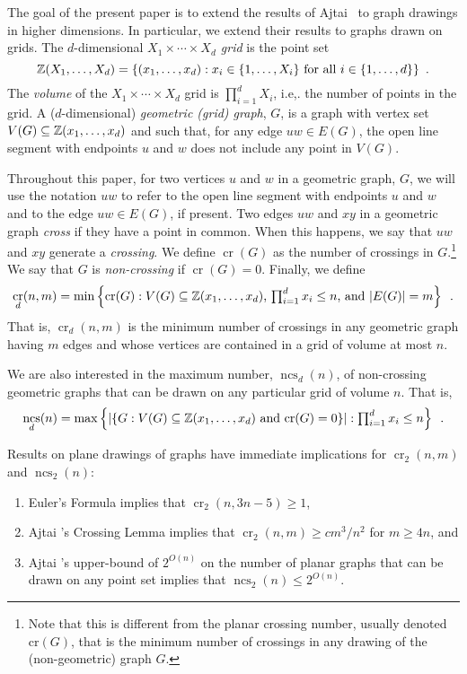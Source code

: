\documentclass{patmorin}
\DeclareMathOperator{\crs}{cr}
\DeclareMathOperator{\ncs}{ncs}
\begin{document}
The goal of the present paper is to extend the results of Ajtai
\etal\ to graph drawings in higher dimensions.  In particular, we
extend their results to graphs drawn on grids.  The $d$-dimensional
\emph{$X_1\times\cdots\times X_d$ grid} is the point set
\[  \mathbb{Z}(X_1,\ldots,X_d) = \{(x_1,\ldots,x_d): 
      \mbox{$x_i\in\{1,\ldots,X_i\}$ for all $i\in\{1,\ldots,d\}$}\}
	\enspace .\]
The \emph{volume} of the $X_1\times\cdots\times X_d$ grid is
$\prod_{i=1}^d X_i$, i.e,. the number of points in the grid.
A ($d$-dimensional) \emph{geometric (grid) graph}, $G$, is a graph with
vertex set $V(G)\subseteq \mathbb{Z}(x_1,\ldots,x_d)$ and such that, for any
edge $uw\in E(G)$, the open line segment with endpoints $u$ and $w$
does not include any point in $V(G)$.

Throughout this paper, for two vertices $u$ and $w$ in a geometric graph,
$G$, we will use the notation $uw$ to refer to the open line segment
with endpoints $u$ and $w$ and to the edge $uw\in E(G)$, if present.
Two edges $uw$ and $xy$ in a geometric graph \emph{cross} if they have a
point in common.  When this happens, we say that $uw$ and $xy$ generate
a \emph{crossing}.  We define $\crs(G)$ as the number of crossings
in $G$.\footnote{Note that this is different from the planar crossing
number, usually denoted $\mathrm{cr}(G)$, that is the minimum number of
crossings in any drawing of the (non-geometric) graph $G$.}  We say that
$G$ is \emph{non-crossing} if $\crs(G)=0$.  Finally, we define
\[ \crs_d(n,m)=\min\left\{\crs(G):\mbox{%
   $V(G)\subseteq\Z(x_1,\ldots,x_d)$,
   $\prod_{i=1}^d x_i\le n$,
   and $|E(G)|=m$}
   \right\} \enspace .
\]
That is, $\crs_d(n,m)$ is the minimum number of crossings in any geometric
graph having $m$ edges and whose vertices are contained in a grid of
volume at most $n$.

We are also interested in the maximum number, $\ncs_d(n)$, of non-crossing
geometric graphs that can be drawn on any particular grid of volume $n$.
That is,
\[
  \ncs_d(n) = \max\left\{
     \left|\left\{G:\mbox{$V(G)\subseteq\Z(x_1,\ldots,x_d)$
            and $\crs(G)=0$} \right\}\right| :
    \mbox{$\prod_{i=1}^d x_i \le n$} \right\} \enspace .
\]

Results on plane drawings of graphs have immediate implications
for $\crs_2(n,m)$ and $\ncs_2(n)$:
\begin{enumerate}
  \item  Euler's Formula implies that $\crs_2(n,3n-5)\ge 1$,
  \item  Ajtai \etal's Crossing Lemma implies that $\crs_2(n,m)\ge
  cm^3/n^2$ for $m\ge 4n$, and
  \item  Ajtai \etal's upper-bound of $2^{O(n)}$ on the number of planar
  graphs that can be drawn on any point set implies that $\ncs_2(n)\le
  2^{O(n)}$.
\end{enumerate}
\end{document}
